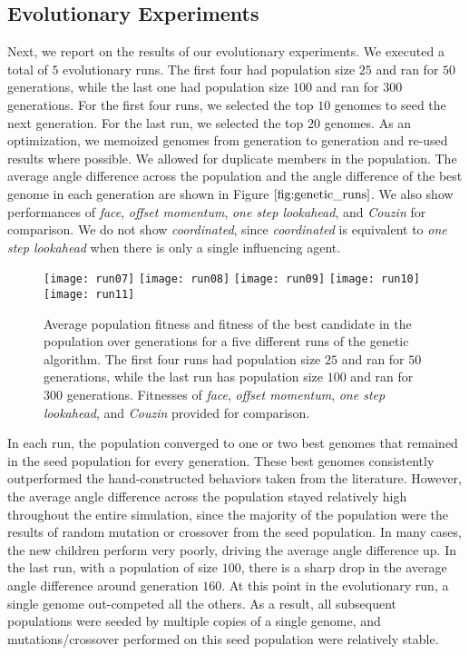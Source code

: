 \subsection{Evolutionary Experiments}
Next, we report on the results of our evolutionary experiments.
We executed a total of $5$ evolutionary runs.
The first four had population size $25$ and ran for $50$ generations, while the
last one had population size $100$ and ran for $300$ generations.
For the first four runs, we selected the top $10$ genomes to seed the next
generation.
For the last run, we selected the top $20$ genomes.
As an optimization, we memoized genomes from generation to generation and re-used
results where possible.
We allowed for duplicate members in the population.
The average angle difference across the population and the angle difference of
the best genome in each generation are shown in Figure $\ref{fig:genetic_runs}$.
We also show performances of \textit{face}, \textit{offset momentum},
\textit{one step lookahead}, and \textit{Couzin} for comparison.
We do not show \textit{coordinated}, since \textit{coordinated} is equivalent
to \textit{one step lookahead} when there is only a single influencing agent.
\begin{figure}
    \centering
    \texttt{[image: run07]}
    \texttt{[image: run08]}
    \texttt{[image: run09]}
    \texttt{[image: run10]}
    \texttt{[image: run11]}
    \caption{Average population fitness and fitness of the best candidate in the
    population over generations for a five different runs of the genetic algorithm.
    The first four runs had population size $25$ and ran for $50$ generations,
    while the last run has population size $100$ and ran for $300$ generations.
    Fitnesses of \textit{face}, \textit{offset momentum}, \textit{one step
    lookahead}, and \textit{Couzin} provided for comparison.}
    \label{fig:genetic_runs}
\end{figure}

In each run, the population converged to one or two best genomes that remained
in the seed population for every generation.
These best genomes consistently outperformed the hand-constructed behaviors
taken from the literature.
However, the average angle difference across the population stayed relatively
high throughout the entire simulation, since the majority of the population
were the results of random mutation or crossover from the seed population.
In many cases, the new children perform very poorly, driving the average angle
difference up.
In the last run, with a population of size $100$, there is a sharp drop in the
average angle difference around generation $160$.
At this point in the evolutionary run, a single genome out-competed all the
others.
As a result, all subsequent populations were seeded by multiple copies of a
single genome, and mutations/crossover performed on this seed population
were relatively stable.

